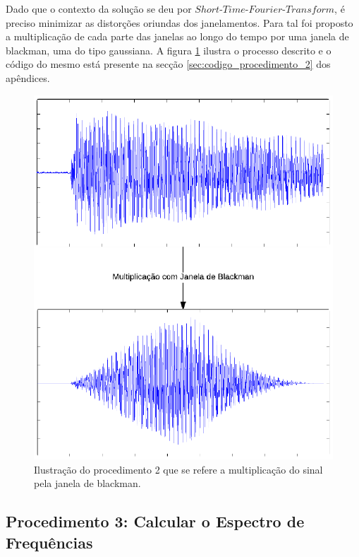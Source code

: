 Dado que o contexto da solução se deu por $Short$-$Time$-$Fourier$-$Transform$, é preciso minimizar as distorções oriundas dos janelamentos. Para tal foi proposto a multiplicação de cada parte das janelas ao longo do tempo por uma janela de blackman, uma do tipo gaussiana. A figura \ref{fig:procedimento_2} ilustra o processo descrito e o código do mesmo está presente na secção \ref{sec:codigo_procedimento_2} dos apêndices.

\begin{figure}[h] 
  \centering
    \includegraphics[keepaspectratio=true, scale=0.7]{figuras/procedimento_2}
    \caption{Ilustração do procedimento 2 que se refere a multiplicação do sinal pela janela de blackman.}
    \label{fig:procedimento_2}
\end{figure}

\subsection{Procedimento 3: Calcular o Espectro de Frequências}
\label{subsec:procedimento_3}

